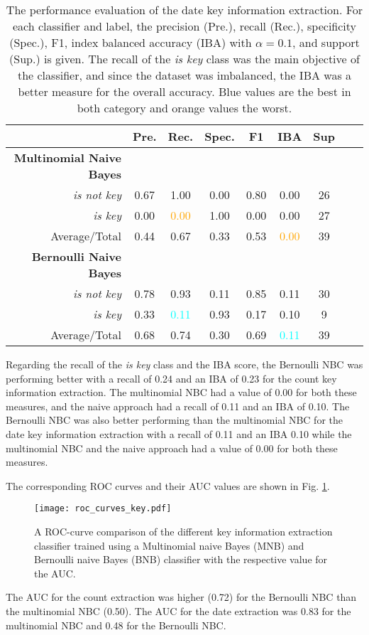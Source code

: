   \begin{table}[h!]
    \caption{The performance evaluation of the date key information extraction. For each classifier and label, the precision (Pre.), recall (Rec.), specificity (Spec.), F1, index balanced accuracy (IBA) with $\alpha = 0.1$, and support (Sup.) is given. The recall of the \textsl{is key} class was the main objective of the classifier, and since the dataset was imbalanced, the IBA was a better measure for the overall accuracy. Blue values are the best in both category and orange values the worst.}
    \centering
    \begin{tabular}{@{}rcccccccc@{}}
      \toprule
       & \textbf{Pre.} & \textbf{Rec.} & \textbf{Spec.}
      & \textbf{F1} &  \textbf{IBA}& \textbf{Sup} \\
      \midrule
      \textbf{Multinomial Naive Bayes}\\
      \textsl{is not key}& 0.67& 1.00&  0.00& 0.80& 0.00& 26 \\
      \textsl{is key}& 0.00& \textcolor{orange}{0.00}&  1.00& 0.00& 0.00& 27 \\
      Average/Total& 0.44& 0.67& 0.33& 0.53& \textcolor{orange}{0.00}& 39 \vspace{2mm}\\
      \textbf{Bernoulli Naive Bayes}\\
      \textsl{is not key}& 0.78& 0.93&  0.11& 0.85& 0.11& 30 \\
      \textsl{is key}& 0.33& \textcolor{cyan}{0.11}&  0.93& 0.17& 0.10& 9 \\
      Average/Total& 0.68& 0.74& 0.30& 0.69& \textcolor{cyan}{0.11}& 39 \vspace{2mm}\\
      \bottomrule
    \end{tabular}
  \label{table:keyword_performance_dates}
  \end{table}
  Regarding the recall of the \textsl{is key} class and the IBA score, the Bernoulli NBC was performing better with a recall of 0.24 and an IBA of 0.23 for the count key information extraction. The multinomial NBC had a value of 0.00 for both these measures, and the naive approach had a recall of 0.11 and an IBA of 0.10.
  The Bernoulli NBC was also better performing than the multinomial NBC for the date key information extraction with a recall of 0.11 and an IBA 0.10 while the multinomial NBC and the naive approach had a value of 0.00 for both these measures.

  The corresponding ROC curves and their AUC values are shown in Fig. \ref{fig:roc_key}.
  \begin{figure}[h!]
    \centering
    \texttt{[image: roc\_curves\_key.pdf]}
    \caption{A ROC-curve comparison of the different key information extraction classifier trained using a Multinomial naive Bayes (MNB) and Bernoulli naive Bayes (BNB) classifier with the respective value for the AUC.}
  \label{fig:roc_key}
  \end{figure}
  The AUC for the count extraction was higher (0.72) for the Bernoulli NBC than the multinomial NBC (0.50).
  The AUC for the date extraction was 0.83 for the multinomial NBC and 0.48 for the Bernoulli NBC.

